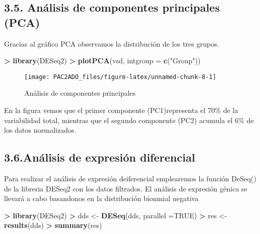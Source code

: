 \documentclass[
]{article}
\newenvironment{Shaded}{\begin{snugshade}}{\end{snugshade}}
\newcommand{\DataTypeTok}[1]{\textcolor[rgb]{0.13,0.29,0.53}{#1}}
\newcommand{\KeywordTok}[1]{\textcolor[rgb]{0.13,0.29,0.53}{\textbf{#1}}}
\newcommand{\NormalTok}[1]{#1}
\newcommand{\OperatorTok}[1]{\textcolor[rgb]{0.81,0.36,0.00}{\textbf{#1}}}
\newcommand{\OtherTok}[1]{\textcolor[rgb]{0.56,0.35,0.01}{#1}}
\newcommand{\StringTok}[1]{\textcolor[rgb]{0.31,0.60,0.02}{#1}}
\begin{document}
\hypertarget{anuxe1lisis-de-componentes-principales-pca}{%
\subsection{3.5. Análisis de componentes principales
(PCA)}\label{anuxe1lisis-de-componentes-principales-pca}}

Gracias al gráfico PCA observamos la distribución de los tres grupos.

\begin{Shaded}
\begin{Highlighting}[]
\OperatorTok{>}\StringTok{ }\KeywordTok{library}\NormalTok{(DESeq2)}
\OperatorTok{>}\StringTok{ }\KeywordTok{plotPCA}\NormalTok{(vsd, }\DataTypeTok{intgroup =} \KeywordTok{c}\NormalTok{(}\StringTok{"Group"}\NormalTok{))}
\end{Highlighting}
\end{Shaded}

\begin{figure}

{\centering \texttt{[image: PAC2ADO\_files/figure-latex/unnamed-chunk-8-1]} 

}

\caption{Análisis de componentes principales}\label{fig:unnamed-chunk-8}
\end{figure}

En la figura vemos que el primer componente (PC1)representa el 70\% de
la variabilidad total, mientras que el segundo componente (PC2) acumula
el 6\% de los datos normalizados.

\hypertarget{anuxe1lisis-de-expresiuxf3n-diferencial}{%
\subsection{3.6.Análisis de expresión
diferencial}\label{anuxe1lisis-de-expresiuxf3n-diferencial}}

Para realizar el análisis de expresión deiferencial emplearemos la
función DeSeq() de la libreria DESeq2 con los datos filtrados. El
análisis de expresión génica se llevará a cabo basandonos en la
distribución bionmial negativa

\begin{Shaded}
\begin{Highlighting}[]
\OperatorTok{>}\StringTok{ }\KeywordTok{library}\NormalTok{(DESeq2)}
\OperatorTok{>}\StringTok{ }\NormalTok{dds <-}\StringTok{ }\KeywordTok{DESeq}\NormalTok{(dds, }\DataTypeTok{parallel =}\OtherTok{TRUE}\NormalTok{)}
\OperatorTok{>}\StringTok{ }\NormalTok{res <-}\StringTok{ }\KeywordTok{results}\NormalTok{(dds)}
\OperatorTok{>}\StringTok{ }\KeywordTok{summary}\NormalTok{(res)}
\end{Highlighting}
\end{Shaded}
\end{document}
